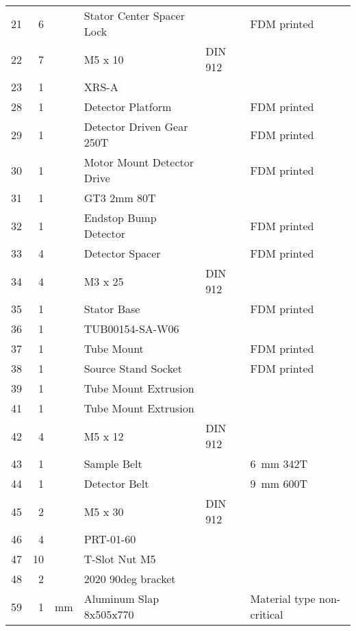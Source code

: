 \begin{table}[!ht]
\begin{tabular}{@{}rrllll@{}}
        21&	6&	&	Stator Center Spacer Lock               &	&		FDM printed\\
        22&	7&	&	M5 x 10                                 &	DIN 912&		\\
        23&	1&	&	XRS-A                                   &	&		\\
        28&	1&	&	Detector Platform                       &	&		FDM printed\\
        29&	1&	&	Detector Driven Gear 250T               &	&		FDM printed\\
        30&	1&	&	Motor Mount Detector Drive              &	&		FDM printed\\
        31&	1&	&	GT3 2mm 80T                             &	&		\\
        32&	1&	&	Endstop Bump Detector                   &	&		FDM printed\\
        33&	4&	&	Detector Spacer                         &	&		FDM printed\\
        34&	4&	&	M3 x 25                                 &	DIN 912&		\\
        35&	1&	&	Stator Base                             &	&		FDM printed\\
        36&	1&	&	TUB00154-SA-W06                         &	&		\\
        37&	1&	&	Tube Mount                              &	&		FDM printed\\
        38&	1&	&	Source Stand Socket                     &	&		FDM printed\\
        39&	1&	&	Tube Mount Extrusion                    &	&		\\
        41&	1&	&	Tube Mount Extrusion                    &	&		\\
        42&	4&	&	M5 x 12                                 &	DIN 912&		\\
        43&	1&	&	Sample Belt                             &	&		\qty{6}{\milli\meter} 342T\\
        44&	1&	&	Detector Belt                           &	&		\qty{9}{\milli\meter} 600T\\
        45&	2&	&	M5 x 30                                 &	DIN 912&		\\
        46&	4&	&	PRT-01-60                               &	&		\\
        47&	10&	&	T-Slot Nut M5                           &	&		\\
        48&	2&	&	2020 90deg bracket                      &	        &		\\
        59& 1& \unit{\milli\metre}& Aluminum Slap 8x505x770 & & Material type non-critical\\
        \bottomrule
    \end{tabular}
\end{table}
